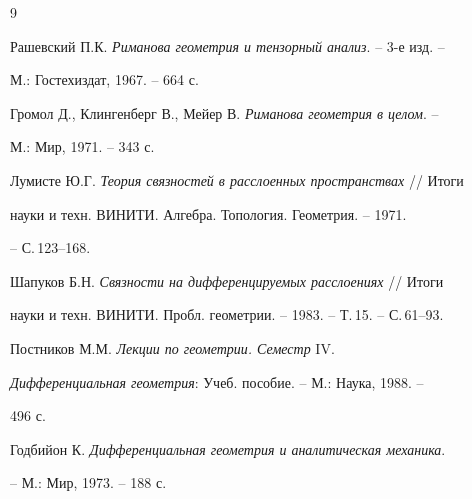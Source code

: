 \begin{thebibliography}{9} 


 




Рашевский П.К. {\em Риманова геометрия и тензорный анализ}. -- 3-е изд. --


М.: Гостехиздат, 1967. -- 664 с.




Громол Д., Клингенберг В., Мейер В. {\em Риманова геометрия в целом}. -- 


М.: Мир, 1971. -- 343 с.




Лумисте Ю.Г. {\em Теория связностей в расслоенных пространствах} // Итоги 


науки и техн. ВИНИТИ. Алгебра. Топология. Геометрия. -- 1971.


-- С.\,123--168.




Шапуков Б.Н. {\em Связности на дифференцируемых расслоениях} // Итоги 


науки и техн. ВИНИТИ. Пробл. геометрии. -- 1983. -- Т.\,15. -- С.\,61--93.




Постников М.М. {\em Лекции по геометрии. Семестр} IV.


{\em Дифференциальная геометрия}: Учеб. пособие. -- М.: Наука, 1988. -- 


496 с.




Годбийон К. {\em Дифференциальная геометрия и аналитическая механика}. 


-- М.: Мир, 1973. -- 188 с.


 


\end{thebibliography} 


 


\vskip 2cm 


 






 


\label{end} 


 